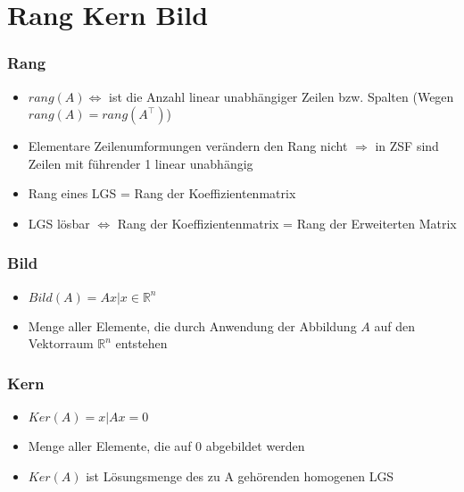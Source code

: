 \section{Rang Kern Bild}
\begin{frame}
    \frametitle{Rang}
    \begin{itemize}
        \item $rang(A) \Leftrightarrow$ ist die Anzahl linear unabhängiger Zeilen bzw. Spalten (Wegen $rang(A)=rang(A^\top)$)
        \item Elementare Zeilenumformungen verändern den Rang nicht $\Rightarrow$ in ZSF sind Zeilen mit führender 1 linear unabhängig
        \item Rang eines LGS = Rang der Koeffizientenmatrix
        \item LGS lösbar $\Leftrightarrow$ Rang der Koeffizientenmatrix = Rang der Erweiterten Matrix
    \end{itemize}
\end{frame}

\begin{frame}
    \frametitle{Bild}
    \begin{itemize}
        \item $Bild(A)={Ax | x\in \mathbb{R}^n}$
        \item Menge aller Elemente, die durch Anwendung der Abbildung $A$ auf den Vektorraum $\mathbb{R}^n$ entstehen
    \end{itemize}
\end{frame}

\begin{frame}
    \frametitle{Kern}
    \begin{itemize}
        \item $Ker(A)={x | Ax=0}$
        \item Menge aller Elemente, die auf 0 abgebildet werden
        \item $Ker(A)$ ist Lösungsmenge des zu A gehörenden homogenen LGS
    \end{itemize}
\end{frame}
